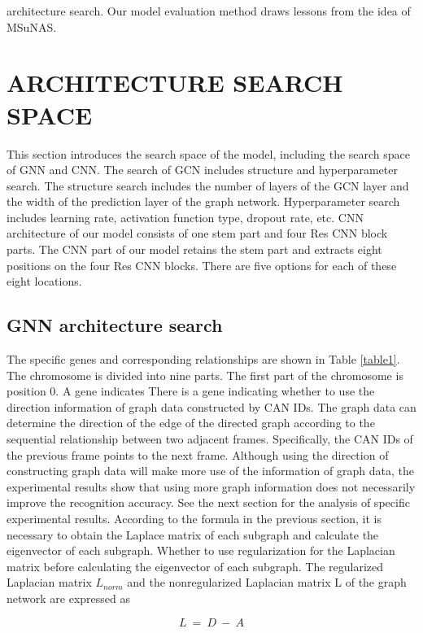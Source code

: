 \documentclass[lettersize,journal]{IEEEtran}
\begin{document}
architecture search. Our model evaluation method draws lessons from the idea of MSuNAS.

\section{ARCHITECTURE SEARCH SPACE}\label{section_architecture_search_space}
This section introduces the search space of the model, including the search space of GNN and CNN. The search of GCN includes structure and hyperparameter search. The structure search includes the number of layers of the GCN layer and the width of the prediction layer of the graph network. Hyperparameter search includes learning rate, activation function type, dropout rate, etc. CNN \cite{48} architecture of our model consists of one stem part and four Res CNN block parts. The CNN part of our model retains the stem part and extracts eight positions on the four Res CNN blocks. There are five options for each of these eight locations.

\subsection{GNN architecture search}
The specific genes and corresponding relationships are shown in Table \ref{table1}. The chromosome is divided into nine parts. The first part of the chromosome is position 0. A gene indicates There is a gene indicating whether to use the direction information of graph data constructed by CAN IDs. The graph data can determine the direction of the edge of the directed graph according to the sequential relationship between two adjacent frames. Specifically, the CAN IDs of the previous frame points to the next frame. Although using the direction of constructing graph data will make more use of the information of graph data, the experimental results show that using more graph information does not necessarily improve the recognition accuracy. See the next section for the analysis of specific experimental results. According to the formula in the previous section, it is necessary to obtain the Laplace matrix of each subgraph and calculate the eigenvector of each subgraph. Whether to use regularization for the Laplacian matrix before calculating the eigenvector of each subgraph. The regularized Laplacian matrix $L_{norm}$ and the nonregularized Laplacian matrix L of the graph network are expressed as

\begin{equation}
\label{deqn_ex_7}
L\ =\ D\ -\ A
\end{equation}
\end{document}
